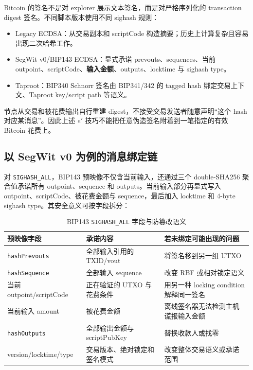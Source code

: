 \documentclass[11pt,a4paper,fontset=none]{ctexart}
\begin{document}
Bitcoin 的签名不是对 explorer 展示文本签名，而是对严格序列化的 transaction digest 签名。不同脚本版本使用不同 sighash 规则：

\begin{itemize}[leftmargin=2em]
  \item Legacy ECDSA：从交易副本和 scriptCode 构造摘要；历史上计算复杂且容易出现二次哈希工作。
  \item SegWit v0/BIP143 ECDSA：显式承诺 prevouts、sequences、当前 outpoint、scriptCode、\textbf{输入金额}、outputs、locktime 与 sighash type。
  \item Taproot：BIP340 Schnorr 签名由 BIP341/342 的 tagged hash 绑定交易上下文、Taproot key/script path 等语义。
\end{itemize}

节点从交易和被花费输出自行重建 digest，不接受交易发送者随意声明“这个 hash 对应某消息”。因此上述 $e'$ 技巧不能把任意伪造签名附着到一笔指定的有效 Bitcoin 花费上。

\subsection{以 SegWit v0 为例的消息绑定链}

对 \texttt{SIGHASH\_ALL}，BIP143 预映像不仅含当前输入，还通过三个 double-SHA256 聚合值承诺所有 outpoint、sequence 和 outputs。当前输入部分再显式写入 outpoint、scriptCode、被花费金额与 sequence，最后加入 locktime 和 4-byte sighash type。其安全意义可按字段拆分：

\begin{table}[htbp]
\centering
\caption{BIP143 \texttt{SIGHASH\_ALL} 字段与防篡改语义}
\label{tab:bip143-binding}
\begin{tabular}{p{}p{}p{}}
\toprule
预映像字段 & 承诺内容 & 若未绑定可能出现的问题 \\
\midrule
\texttt{hashPrevouts} & 全部输入引用的 TXID/vout & 将签名移到另一组 UTXO \\
\texttt{hashSequence} & 全部输入 sequence & 改变 RBF 或相对锁定语义 \\
当前 outpoint/scriptCode & 正在验证的 UTXO 与花费条件 & 用另一种 locking condition 解释同一签名 \\
当前输入 amount & 被花费金额 & 离线签名器无法检测主机谎报输入金额 \\
\texttt{hashOutputs} & 全部输出金额与 scriptPubKey & 替换收款人或找零 \\
version/locktime/type & 交易版本、绝对锁定和签名模式 & 改变整体交易语义或承诺范围 \\
\bottomrule
\end{tabular}
\end{table}
\end{document}
